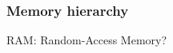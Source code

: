 \begin{frame}
  \frametitle{Memory hierarchy}
  \begin{figure}
    \centering
    
  \end{figure}
  \pause
  \begin{center}
    RAM: Random-Access Memory?
  \end{center}
\end{frame}
